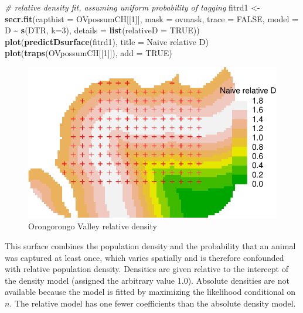 \documentclass[
]{book}
\newenvironment{Shaded}{\begin{snugshade}}{\end{snugshade}}
\newcommand{\AttributeTok}[1]{\textcolor[rgb]{0.13,0.29,0.53}{#1}}
\newcommand{\CommentTok}[1]{\textcolor[rgb]{0.56,0.35,0.01}{\textit{#1}}}
\newcommand{\ConstantTok}[1]{\textcolor[rgb]{0.56,0.35,0.01}{#1}}
\newcommand{\DecValTok}[1]{\textcolor[rgb]{0.00,0.00,0.81}{#1}}
\newcommand{\FunctionTok}[1]{\textcolor[rgb]{0.13,0.29,0.53}{\textbf{#1}}}
\newcommand{\NormalTok}[1]{#1}
\newcommand{\OtherTok}[1]{\textcolor[rgb]{0.56,0.35,0.01}{#1}}
\newcommand{\SpecialCharTok}[1]{\textcolor[rgb]{0.81,0.36,0.00}{\textbf{#1}}}
\newcommand{\StringTok}[1]{\textcolor[rgb]{0.31,0.60,0.02}{#1}}
\begin{document}
\begin{Shaded}
\begin{Highlighting}[]
\CommentTok{\# relative density fit, assuming uniform probability of tagging}
\NormalTok{fitrd1 }\OtherTok{\textless{}{-}} \FunctionTok{secr.fit}\NormalTok{(}\AttributeTok{capthist =}\NormalTok{ OVpossumCH[[}\DecValTok{1}\NormalTok{]], }\AttributeTok{mask =}\NormalTok{ ovmask, }
    \AttributeTok{trace =} \ConstantTok{FALSE}\NormalTok{, }\AttributeTok{model =}\NormalTok{ D }\SpecialCharTok{\textasciitilde{}} \FunctionTok{s}\NormalTok{(DTR, }\AttributeTok{k=}\DecValTok{3}\NormalTok{), }\AttributeTok{details =} 
    \FunctionTok{list}\NormalTok{(}\AttributeTok{relativeD =} \ConstantTok{TRUE}\NormalTok{))}
\FunctionTok{plot}\NormalTok{(}\FunctionTok{predictDsurface}\NormalTok{(fitrd1), }\AttributeTok{title =} \StringTok{\textquotesingle{}Naive relative D\textquotesingle{}}\NormalTok{)}
\FunctionTok{plot}\NormalTok{(}\FunctionTok{traps}\NormalTok{(OVpossumCH[[}\DecValTok{1}\NormalTok{]]), }\AttributeTok{add =} \ConstantTok{TRUE}\NormalTok{)}
\end{Highlighting}
\end{Shaded}

\begin{figure}
\centering
\includegraphics{SECRbook_files/figure-latex/relativeD-1.pdf}
\caption{\label{fig:relativeD}Orongorongo Valley relative density}
\end{figure}

This surface combines the population density and the probability that an animal was captured at least once, which varies spatially and is therefore confounded with relative population density. Densities are given relative to the intercept of the density model (assigned the arbitrary value 1.0). Absolute densities are not available because the model is fitted by
maximizing the likelihood conditional on \(n\). The relative model has one fewer coefficients than the absolute density model.
\end{document}
